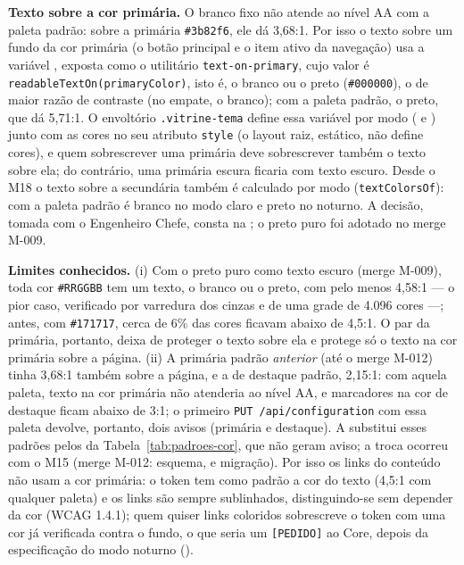 \textbf{Texto sobre a cor primária.} O branco fixo não atende ao nível AA com a paleta padrão: sobre a primária \texttt{\#3b82f6}, ele dá 3,68:1. Por isso o texto sobre um fundo da cor primária (o botão principal e o item ativo da navegação) usa a variável , exposta como o utilitário \texttt{text-on-primary}, cujo valor é \texttt{readableTextOn(primaryColor)}, isto é, o branco ou o preto (\texttt{\#000000}), o de maior razão de contraste (no empate, o branco); com a paleta padrão, o preto, que dá 5,71:1. O envoltório \texttt{.vitrine-tema} define essa variável por modo ( e ) junto com as cores no seu atributo \texttt{style} (o layout raiz, estático, não define cores), e quem sobrescrever uma primária deve sobrescrever também o texto sobre ela; do contrário, uma primária escura ficaria com texto escuro. Desde o M18 o texto sobre a secundária também é calculado por modo (\texttt{textColorsOf}): com a paleta padrão é branco no modo claro e preto no noturno. A decisão, tomada com o Engenheiro Chefe, consta na ; o preto puro foi adotado no merge M-009.

\textbf{Limites conhecidos.} (i) Com o preto puro como texto escuro (merge M-009), toda cor \texttt{\#RRGGBB} tem um texto, o branco ou o preto, com pelo menos 4,58:1 --- o pior caso, verificado por varredura dos cinzas e de uma grade de 4.096 cores ---; antes, com \texttt{\#171717}, cerca de 6\% das cores ficavam abaixo de 4,5:1. O par da primária, portanto, deixa de proteger o texto sobre ela e protege só o texto na cor primária sobre a página. (ii) A primária padrão \emph{anterior} (até o merge M-012) tinha 3,68:1 também sobre a página, e a de destaque padrão, 2,15:1: com aquela paleta, texto na cor primária não atenderia ao nível AA, e marcadores na cor de destaque ficam abaixo de 3:1; o primeiro \texttt{PUT /api/configuration} com essa paleta devolve, portanto, dois avisos (primária e destaque). A  substitui esses padrões pelos da Tabela~\ref{tab:padroes-cor}, que não geram aviso; a troca ocorreu com o M15 (merge M-012: esquema,  e migração). Por isso os links do conteúdo não usam a cor primária: o token  tem como padrão a cor do texto (4,5:1 com qualquer paleta) e os links são sempre sublinhados, distinguindo-se sem depender da cor (WCAG 1.4.1); quem quiser links coloridos sobrescreve o token com uma cor já verificada contra o fundo, o que seria um \texttt{[PEDIDO]} ao Core, depois da especificação do modo noturno ().

